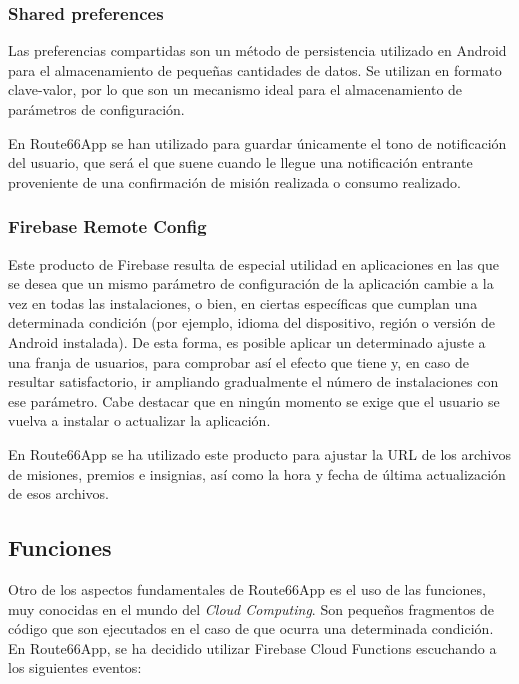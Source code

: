 \documentclass[twoside]{report}
\begin{document}
\subsubsection{Shared preferences}

Las preferencias compartidas son un método de persistencia utilizado en Android para el almacenamiento de pequeñas cantidades de datos. Se utilizan en formato clave-valor, por lo que son un mecanismo ideal para el almacenamiento de parámetros de configuración.

En Route66App se han utilizado para guardar únicamente el tono de notificación del usuario, que será el que suene cuando le llegue una notificación entrante proveniente de una confirmación de misión realizada o consumo realizado.

\subsubsection{Firebase Remote Config}

Este producto de Firebase resulta de especial utilidad en aplicaciones en las que se desea que un mismo parámetro de configuración de la aplicación cambie a la vez en todas las instalaciones, o bien, en ciertas específicas que cumplan una determinada condición (por ejemplo, idioma del dispositivo, región o versión de Android instalada). De esta forma, es posible aplicar un determinado ajuste a una franja de usuarios, para comprobar así el efecto que tiene y, en caso de resultar satisfactorio, ir ampliando gradualmente el número de instalaciones con ese parámetro. Cabe destacar que en ningún momento se exige que el usuario se vuelva a instalar o actualizar la aplicación.

En Route66App se ha utilizado este producto para ajustar la URL de los archivos de misiones, premios e insignias, así como la hora y fecha de última actualización de esos archivos.

\subsection{Funciones}

Otro de los aspectos fundamentales de Route66App es el uso de las funciones, muy conocidas en el mundo del \textit{Cloud Computing}. Son pequeños fragmentos de código que son ejecutados en el caso de que ocurra una determinada condición. En Route66App, se ha decidido utilizar Firebase Cloud Functions escuchando a los siguientes eventos:
\end{document}
